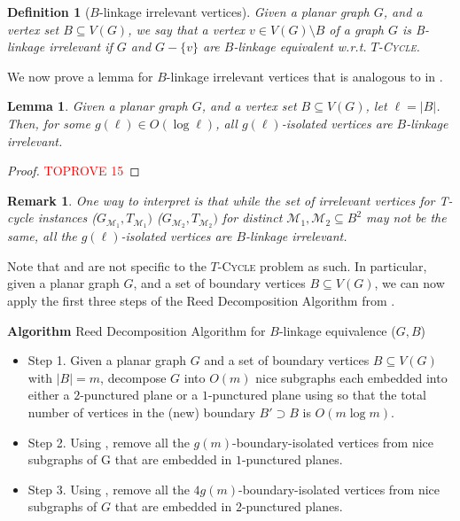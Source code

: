 \documentclass{article}
\newtheorem{lemma}[theorem]{Lemma}
\newtheorem{definition}[theorem]{Definition}
\newtheorem{remark}[theorem]{Remark}
\numberwithin{claimcounter}{lemma}
\newcommand{\tcycle}{$T$-\textsc{Cycle}\xspace}
\begin{document}
\begin{definition}[$B$-linkage irrelevant vertices]
 Given a planar graph $G$, and a vertex set $B\subseteq V(G)$, we say that a vertex $v \in V(G) \setminus B$ of a graph $G$ is \emph{B-linkage irrelevant} if $G$ and $G - \{v\}$ are $B$-linkage equivalent w.r.t. \tcycle.    
\end{definition}

We now prove a lemma for $B$-linkage irrelevant vertices that is analogous to   in .

\begin{lemma} \label{L:linkageirrelevant}
    Given a planar graph $G$, and a vertex set $B\subseteq V(G)$, let $\ell = |B|$. Then, for some $g(\ell) \in O(\log \ell)$, all $g(\ell)$-isolated vertices are $B$-linkage irrelevant. 
\end{lemma}
\begin{proof}\textcolor{red}{TOPROVE 15}\end{proof}

\begin{remark}
    One way to interpret  is that while the set of irrelevant vertices for  T-cycle instances ($G_{\mathcal{M}_1},T_{\mathcal{M}_1})$  ($G_{\mathcal{M}_2},T_{\mathcal{M}_2})$ for distinct $\mathcal{M}_1,\mathcal{M}_2 \subseteq B^2$  may not be the same, all the  $g(\ell)$-isolated vertices are  $B$-linkage irrelevant.
\end{remark}

Note that  and  are not specific to the \tcycle problem as such. In particular,  given a planar graph $G$,  and a set of boundary vertices $B\subseteq V(G)$, we can now apply the first three steps of the {\sc Reed Decomposition Algorithm} from . 


\noindent
{\bf Algorithm} {\sc Reed Decomposition Algorithm for $B$-linkage equivalence} ($G,B$)
\begin{itemize}
\item Step 1. Given a planar graph $G$ and a set of boundary vertices $B\subseteq V(G)$ with $|B|=m $, decompose $G$ into $O(m)$ nice subgraphs each embedded into either a $2$-punctured  plane or a $1$-punctured plane using  so that the total number of  vertices in the (new) boundary $B' \supset B$ is $O(m \log m)$. 
\item Step 2. Using , remove all the $g(m)$-boundary-isolated vertices from nice subgraphs of G that are embedded in $1$-punctured planes.
\item Step 3. Using , remove all the $4 g(m)$-boundary-isolated vertices from nice subgraphs of $G$ that are embedded in $2$-punctured planes.
\end{itemize}
\end{document}
